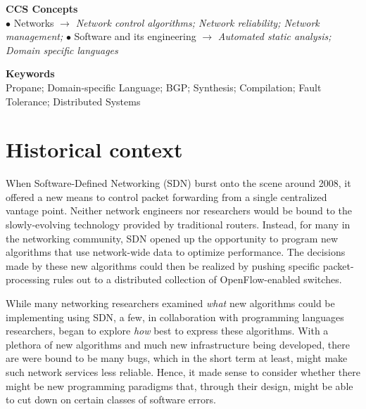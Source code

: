 \documentclass[10pt]{sigalternate052015}
\begin{document}
%
%
%
%


\vspace{0.1in}
\noindent
\textbf{CCS Concepts}\\
$\bullet$ Networks $\rightarrow$ {\em Network control algorithms; Network reliability; Network management;} 
$\bullet$ Software and its engineering $\rightarrow$ {\em Automated static analysis; Domain specific languages}

\vspace{0.1in}
\noindent
\textbf{Keywords}\\
Propane; Domain-specific Language; BGP; Synthesis; Compilation; Fault Tolerance; Distributed Systems




\section{Historical context}

When Software-Defined Networking (SDN) burst onto the scene around 2008,
it offered a new means to control packet forwarding  from a single
centralized vantage point.  Neither network engineers nor 
researchers would be bound to the slowly-evolving technology provided by
traditional routers.  Instead, for many in the networking
community, SDN opened up the opportunity to program new
algorithms that use network-wide data to optimize performance.
The decisions made by these new algorithms could then be realized by
pushing specific packet-processing rules out to a distributed
collection of  OpenFlow-enabled switches.

While many networking researchers examined \emph{what} new algorithms
could be implementing using SDN, a few, in collaboration
with programming languages researchers, began to explore \emph{how}
best to express these algorithms.  With a plethora of new algorithms
and much new infrastructure being developed, there are were bound to
be many bugs, which in the short term at least, might make such network
services less reliable.  Hence, it made sense to consider
whether there might be new programming paradigms that, through their
design, might be able to cut down on certain classes of software
errors.
\end{document}
